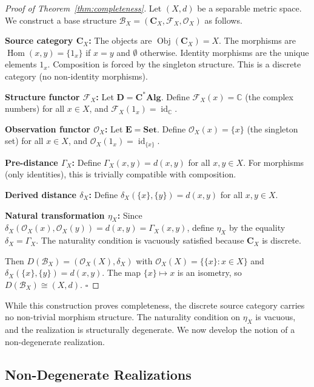\documentclass[11pt,a4paper]{article}
\begin{document}
\begin{proof}[Proof of Theorem~\ref{thm:completeness}]
Let $(X,d)$ be a separable metric space. We construct a base structure
$\mathcal{B}_X=(\mathbf{C}_X,\mathcal{F}_X,\mathcal{O}_X)$ as follows.

\noindent\textbf{Source category $\mathbf{C}_X$:} The objects are
$\operatorname{Obj}(\mathbf{C}_X)=X$. The morphisms are $\operatorname{Hom}(x,y)=\{1_x\}$ if $x=y$ and $\emptyset$ otherwise. Identity morphisms are the unique elements $1_x$. Composition is forced by the singleton structure. This is a discrete category (no non-identity morphisms).

\noindent\textbf{Structure functor $\mathcal{F}_X$:} Let $\mathbf{D}=\mathbf{C^*Alg}$. Define $\mathcal{F}_X(x)=\mathbb{C}$ (the complex numbers) for all $x\in X$, and $\mathcal{F}_X(1_x)=\operatorname{id}_{\mathbb{C}}$.

\noindent\textbf{Observation functor $\mathcal{O}_X$:} Let $\mathbf{E}=\mathbf{Set}$. Define $\mathcal{O}_X(x)=\{x\}$ (the singleton set) for all $x\in X$, and $\mathcal{O}_X(1_x)=\operatorname{id}_{\{x\}}$.

\noindent\textbf{Pre-distance $\Gamma_X$:} Define $\Gamma_X(x,y)=d(x,y)$
for all $x,y\in X$. For morphisms (only identities), this is trivially
compatible with composition.

\noindent\textbf{Derived distance $\delta_X$:} Define
$\delta_X(\{x\},\{y\})=d(x,y)$ for all $x,y\in X$.

\noindent\textbf{Natural transformation $\eta_X$:} Since $\delta_X(\mathcal{O}_X(x),\mathcal{O}_X(y))=d(x,y)=\Gamma_X(x,y)$, define $\eta_X$ by the equality $\delta_X=\Gamma_X$. The naturality condition is vacuously satisfied because $\mathbf{C}_X$ is discrete.

Then $D(\mathcal{B}_X)=(\mathcal{O}_X(X),\delta_X)$ with $\mathcal{O}_X(X)=\{\{x\}:x\in X\}$ and $\delta_X(\{x\},\{y\})=d(x,y)$. The map $\{x\}\mapsto x$ is an isometry, so $D(\mathcal{B}_X)\cong(X,d)$. $\square$
\end{proof}

While this construction proves completeness, the discrete source category
carries no non-trivial morphism structure. The naturality condition on
$\eta_X$ is vacuous, and the realization is structurally degenerate. We now
develop the notion of a non-degenerate realization.

\subsection{Non-Degenerate Realizations}
\end{document}
